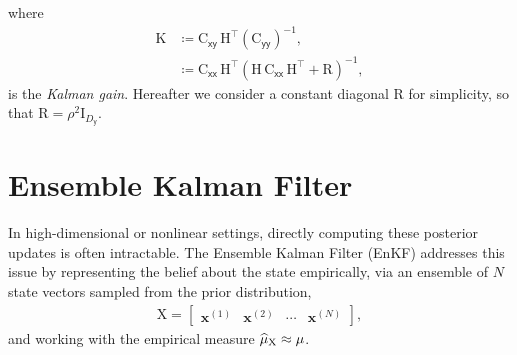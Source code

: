 \documentclass[runningheads]{llncs}
\newcommand{\vv}[1]{\boldsymbol{#1}}
\newcommand{\mm}[1]{\mathrm{#1}}
\newcommand{\rv}[1]{\mathsf{#1}}
\newcommand{\vrv}[1]{\vv{\rv{#1}}}
\begin{document}
where
\begin{align}
\mm{K}
&\coloneq \mm{C}_{\vrv{xy}}\,\mm{H}^\top \left(\mm{C}_{\vrv{yy}}\right)^{-1},\label{eq:kalman-gain}\\
&\coloneq \mm{C}_{\vrv{xx}}\,\mm{H}^\top \left(\mm{H}\,\mm{C}_{\vrv{xx}}\,\mm{H}^\top + \mm{R}\right)^{-1},
\end{align}
is the \emph{Kalman gain}.
Hereafter we consider a constant diagonal \(\mm{R}\) for simplicity, so that \(\mm{R}=\rho^2\mm{I}_{D_{\vrv{y}}}\).

\section{Ensemble Kalman Filter}

In high-dimensional or nonlinear settings, directly computing these posterior updates is often intractable.
The Ensemble Kalman Filter (EnKF) addresses this issue by representing the belief about the state empirically, via an ensemble of \(N\) state vectors sampled from the prior distribution,
\begin{align}
    \mm{X} = \begin{bmatrix} \vv{x}^{(1)} & \vv{x}^{(2)} & \cdots & \vv{x}^{(N)} \end{bmatrix},
\end{align}
and working with the empirical measure $\ELaw[\mm{X}]\approx \Law$.
\end{document}
